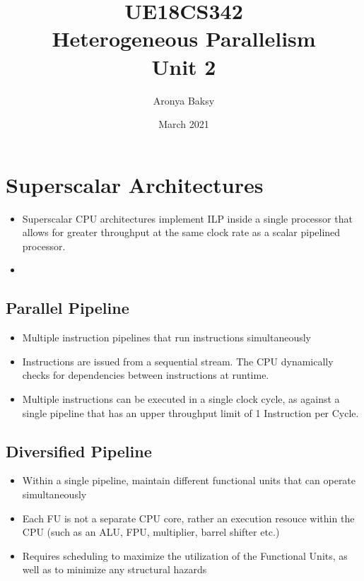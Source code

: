 \documentclass{article}
\title{UE18CS342 \\Heterogeneous Parallelism \\Unit 2}
\author{Aronya Baksy}
\date{March 2021}
\begin{document}
\maketitle
\section{Superscalar Architectures}
\begin{itemize}
    \item Superscalar CPU architectures implement ILP inside a single processor that allows for greater throughput at the same clock rate as a scalar pipelined processor.
    
    \item 
\end{itemize}
\subsection{Parallel Pipeline}
\begin{itemize}
    \item Multiple instruction pipelines that run instructions simultaneously
    
    \item Instructions are issued from a sequential stream. The CPU dynamically checks for dependencies between instructions at runtime.
    
    \item Multiple instructions can be executed in a single clock cycle, as against a single pipeline that has an upper throughput limit of 1 Instruction per Cycle. 
\end{itemize}

\subsection{Diversified Pipeline}
\begin{itemize}
    \item Within a single pipeline, maintain different functional units that can operate simultaneously
    
    \item Each FU is not a separate CPU core, rather an execution resouce within the CPU (such as an ALU, FPU, multiplier, barrel shifter etc.)
    
    \item Requires scheduling to maximize the utilization of the Functional Units, as well as to minimize any structural hazards
\end{itemize}
\end{document}
